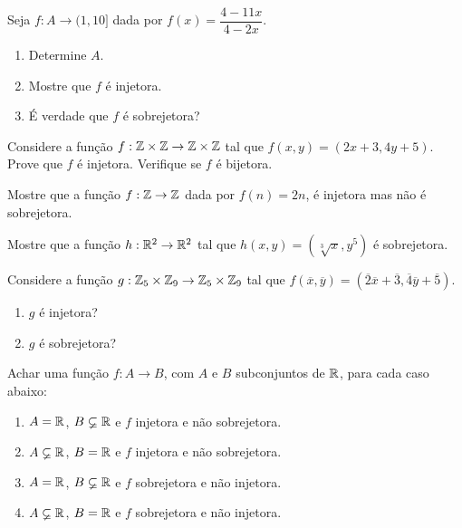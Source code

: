 \documentclass[12pt]{exam}
\begin{document}
\vspace{.3cm}

\questao{} Seja $f : A \to (1,10]$ dada por $f(x) = \dfrac{4 - 11x}{4 - 2x}$.
\begin{enumerate}[label={\alph*})]
    \item Determine $A$.
    \item Mostre que $f$ \'e injetora.
    \item \'E verdade que $f$ \'e sobrejetora?
\end{enumerate}

\vspace{.3cm}

\questao{} Considere a fun{\c c}{\~a}o $f : \mathbb{Z} \times \mathbb{Z} \to \mathbb{Z} \times \mathbb{Z}$ tal que $f(x,y) = (2x + 3, 4y + 5)$. Prove que $f$ {\'e} injetora. Verifique se $f$ {\'e} bijetora.

\vspace{.3cm}

\questao{} Mostre que a fun\c{c}\~ao $f : \mathbb{Z} \to \mathbb{Z}$ dada por $f(n) = 2n$, \'e injetora mas n\~ao \'e sobrejetora.

\vspace{.3cm}

\questao{} Mostre que a fun\c{c}\~ao $h : \mathbb{R}^2 \to \mathbb{R}^2$ tal que $h(x, y) = (\sqrt[3]{x}, y^5)$ \'e sobrejetora.
\vspace{.3cm}

\questao{} Considere a fun{\c c}{\~a}o $g : \mathbb{Z}_5 \times \mathbb{Z}_9 \to \mathbb{Z}_5 \times \mathbb{Z}_9$ tal que $f(\overline{x},\overline{y}) = (\overline{2} \overline{x} + \overline{3}, \overline{4}\overline{y} + \overline{5})$.
\begin{enumerate}[label={\alph*})]
    \item $g$ \'e injetora?
    \item $g$ \'e sobrejetora?
\end{enumerate}

\vspace{.3cm}

\questao{} Achar uma fun{\c c}{\~a}o $f : A \to B$, com $A$ e $B$ subconjuntos de $\mathbb{R}$, para cada caso abaixo:
\begin{enumerate}[label={\alph*})]
    \item $A = \mathbb{R}$, $B \varsubsetneq \mathbb{R}$ e $f$ injetora e n{\~a}o sobrejetora.
    \item $A \varsubsetneq \mathbb{R}$, $B = \mathbb{R}$ e $f$ injetora e n{\~a}o sobrejetora.
    \item $A = \mathbb{R}$, $B \varsubsetneq \mathbb{R}$ e $f$ sobrejetora e n{\~a}o injetora.
    \item $A \varsubsetneq \mathbb{R}$, $B = \mathbb{R}$ e $f$ sobrejetora e n{\~a}o injetora.
\end{enumerate}
\end{document}
